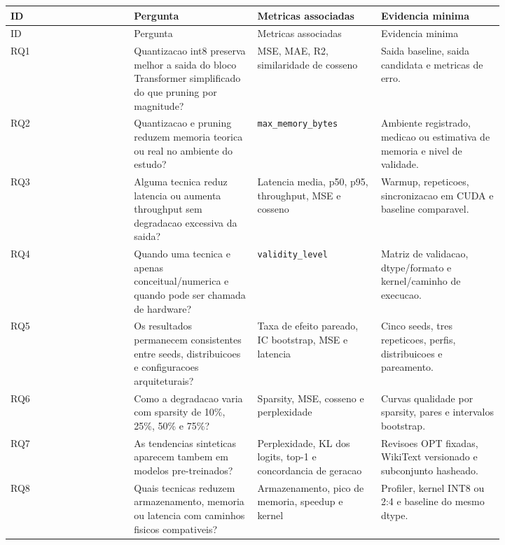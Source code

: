 \begin{longtable}{@{}>{\RaggedRight\arraybackslash}p{0.205\linewidth}>{\RaggedRight\arraybackslash}p{0.205\linewidth}>{\RaggedRight\arraybackslash}p{0.205\linewidth}>{\RaggedRight\arraybackslash}p{0.205\linewidth}@{}}
\toprule
ID & Pergunta & Metricas associadas & Evidencia minima \\
\midrule
\endfirsthead
\toprule
ID & Pergunta & Metricas associadas & Evidencia minima \\
\midrule
\endhead
RQ1 & Quantizacao int8 preserva melhor a saida do bloco Transformer simplificado do que pruning por magnitude? & MSE, MAE, R2, similaridade de cosseno & Saida baseline, saida candidata e metricas de erro. \\
RQ2 & Quantizacao e pruning reduzem memoria teorica ou real no ambiente do estudo? & \texttt{max\_\allowbreak{}memory\_\allowbreak{}bytes} & Ambiente registrado, medicao ou estimativa de memoria e nivel de validade. \\
RQ3 & Alguma tecnica reduz latencia ou aumenta throughput sem degradacao excessiva da saida? & Latencia media, p50, p95, throughput, MSE e cosseno & Warmup, repeticoes, sincronizacao em CUDA e baseline comparavel. \\
RQ4 & Quando uma tecnica e apenas conceitual/numerica e quando pode ser chamada de hardware? & \texttt{validity\_\allowbreak{}level} & Matriz de validacao, dtype/formato e kernel/caminho de execucao. \\
RQ5 & Os resultados permanecem consistentes entre seeds, distribuicoes e configuracoes arquiteturais? & Taxa de efeito pareado, IC bootstrap, MSE e latencia & Cinco seeds, tres repeticoes, perfis, distribuicoes e pareamento. \\
RQ6 & Como a degradacao varia com sparsity de 10\%, 25\%, 50\% e 75\%? & Sparsity, MSE, cosseno e perplexidade & Curvas qualidade por sparsity, pares e intervalos bootstrap. \\
RQ7 & As tendencias sinteticas aparecem tambem em modelos pre-treinados? & Perplexidade, KL dos logits, top-1 e concordancia de geracao & Revisoes OPT fixadas, WikiText versionado e subconjunto hasheado. \\
RQ8 & Quais tecnicas reduzem armazenamento, memoria ou latencia com caminhos fisicos compativeis? & Armazenamento, pico de memoria, speedup e kernel & Profiler, kernel INT8 ou 2:4 e baseline do mesmo dtype. \\
\bottomrule
\end{longtable}



